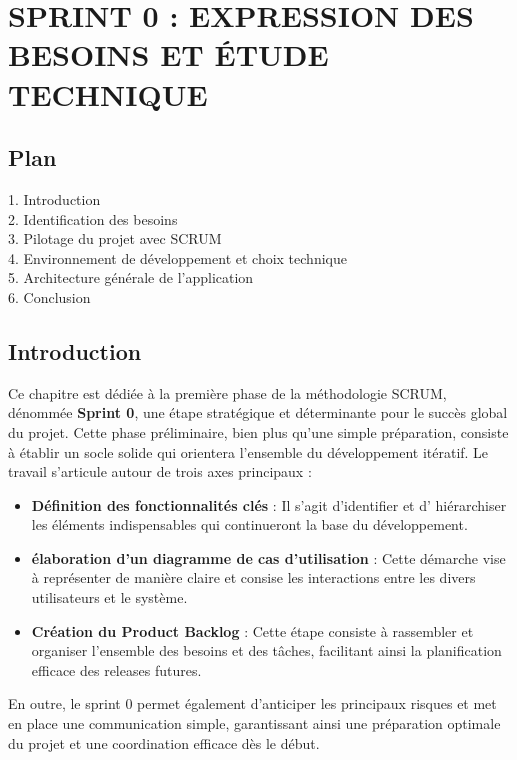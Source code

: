 \documentclass[a4paper,11pt]{report}
\begin{document}
\newpage

\chapter{ SPRINT 0 : EXPRESSION DES BESOINS ET ÉTUDE TECHNIQUE  }
\section*{Plan}

1. Introduction\\
2. Identification des besoins \\
3. Pilotage du projet avec SCRUM\\
4. Environnement de développement et choix technique \\
5. Architecture générale de l'application \\
6. Conclusion \\

\newpage
\section{Introduction}

Ce chapitre est dédiée à la première phase de la méthodologie SCRUM, dénommée \textbf{Sprint 0}, 
une étape stratégique et déterminante pour le succès global du projet.
\newline
\newline
Cette phase préliminaire, bien plus qu'une simple préparation, consiste à établir un socle solide qui orientera l'ensemble du développement itératif. Le travail s'articule autour de trois axes principaux : 
 \begin{itemize}
 	\item \textbf{Définition des fonctionnalités clés} : Il s'agit d'identifier et d' hiérarchiser les éléments indispensables qui continueront la base du développement.
 	\item \textbf{élaboration d'un diagramme de cas d'utilisation} : Cette démarche vise à représenter de manière claire et consise les interactions entre les divers utilisateurs et le système. 
 	\item \textbf{Création du Product Backlog } : Cette étape consiste à rassembler et organiser l'ensemble des besoins et des tâches, facilitant ainsi la planification efficace des releases futures.\\
 \end{itemize}


En outre, le sprint 0 permet également d'anticiper les principaux risques et met en place une communication simple, garantissant ainsi une préparation optimale du projet et une coordination efficace dès le début.
\end{document}
